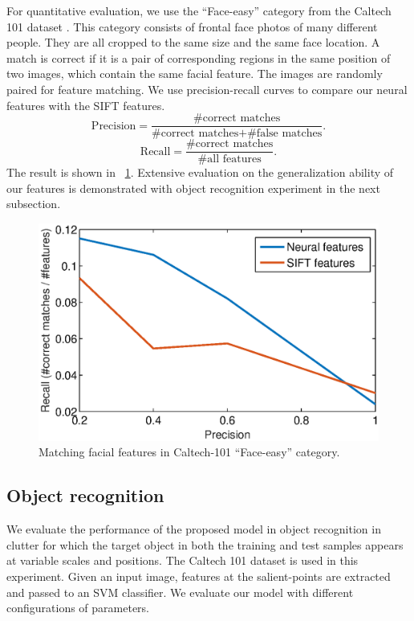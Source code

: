 \documentclass[twocolumn]{article}
\begin{document}
For quantitative evaluation, we use the ``Face-easy'' category from the Caltech 101 dataset \cite{fei2007}.
This category consists of frontal face photos of many different people.
They are all cropped to the same size and the same face location.
A match is correct if it is a pair of corresponding regions in the same position of two images, which contain the same facial feature.
The images are randomly paired for feature matching.
We use precision-recall curves to compare our neural features with the SIFT features.
\begin{equation}
\text{Precision} = \frac{\text{\#correct matches}}{\text{\#correct matches} + \text{\#false matches}}.
\end{equation}
\begin{equation}
\text{Recall} = \frac{\text{\#correct matches}}{\text{\#all features}}.
\end{equation}
The result is shown in \figurename~\ref{fig:13}.
Extensive evaluation on the generalization ability of our features is demonstrated with object recognition experiment in the next subsection.

\begin{figure}[!t]
\centerline{\includegraphics[width=0.9\linewidth]{fig13.eps}} 
\caption{Matching facial features in Caltech-101 ``Face-easy'' category.}
\label{fig:13}
\end{figure}

\subsection{Object recognition}

We evaluate the performance of the proposed model in object recognition in clutter for which 
the target object in both the training and test samples appears at variable scales and positions.
The Caltech 101 dataset \cite{fei2007} is used in this experiment.
Given an input image, features at the salient-points are extracted and passed to an SVM classifier.
We evaluate our model with different configurations of parameters.
\end{document}
